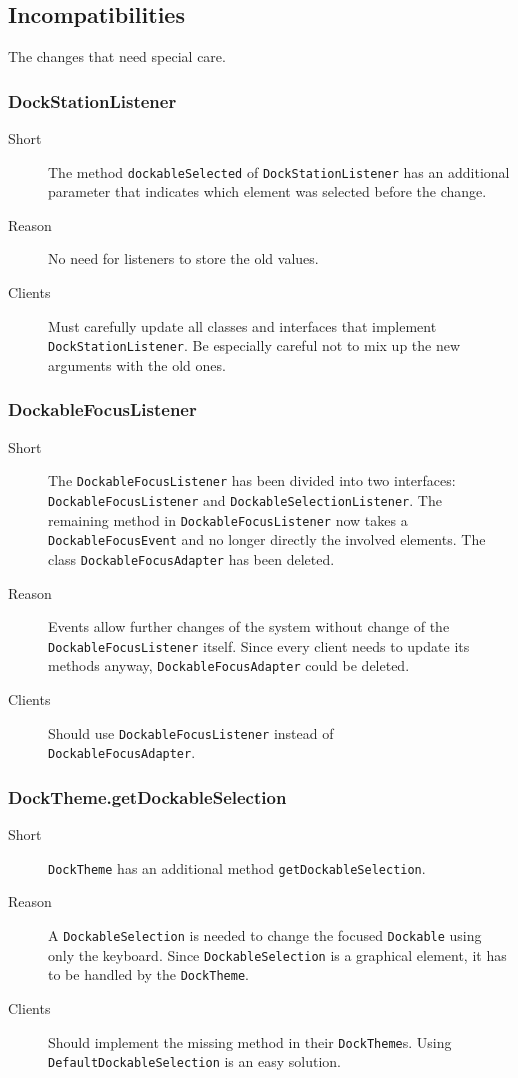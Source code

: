 \documentclass[a4paper,10pt]{article}
\newcommand{\src}[1]{\lstinline[basicstyle=\normalsize\ttfamily,keywordstyle=\normalsize\ttfamily,identifierstyle=\normalsize\ttfamily]|#1|}
\newcommand{\short}{\item[Short]}
\newcommand{\why}{\item[Reason]}
\newcommand{\clients}{\item[Clients]}
\begin{document}
\subsection{Incompatibilities}
The changes that need special care.

\subsubsection{DockStationListener}
\begin{description}
 \short The method \src{dockableSelected} of \src{DockStationListener} has an additional parameter that indicates which element was selected before the change.
 \why No need for listeners to store the old values.
 \clients Must carefully update all classes and interfaces that implement \\\src{DockStationListener}. Be especially careful not to mix up the new arguments with the old ones.
\end{description}

\subsubsection{DockableFocusListener}
\begin{description}
 \short The \src{DockableFocusListener} has been divided into two interfaces: \\\src{DockableFocusListener} and \src{DockableSelectionListener}. The\\remaining method in \src{DockableFocusListener} now takes a \\\src{DockableFocusEvent} and no longer directly the involved elements. The class \src{DockableFocusAdapter} has been deleted.
 \why Events allow further changes of the system without change of the \src{DockableFocusListener} itself. Since every client needs to update its methods anyway, \src{DockableFocusAdapter} could be deleted.
 \clients Should use \src{DockableFocusListener} instead of \\\src{DockableFocusAdapter}.
\end{description}

\subsubsection{DockTheme.getDockableSelection}
\begin{description}
 \short \src{DockTheme} has an additional method \src{getDockableSelection}.
 \why A \src{DockableSelection} is needed to change the focused \src{Dockable} using only the keyboard. Since \src{DockableSelection} is a graphical element, it has to be handled by the \src{DockTheme}.
 \clients Should implement the missing method in their \src{DockTheme}s. Using \src{DefaultDockableSelection} is an easy solution.
\end{description}
\end{document}
